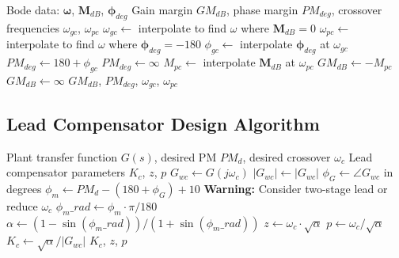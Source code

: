 \begin{algorithm}[H]
\caption{Stability Margin Computation}
\label{alg:margins}
\begin{algorithmic}[1]
\REQUIRE Bode data: $\boldsymbol{\omega}$, $\mathbf{M}_{dB}$, $\boldsymbol{\phi}_{deg}$
\ENSURE Gain margin $GM_{dB}$, phase margin $PM_{deg}$, crossover frequencies $\omega_{gc}$, $\omega_{pc}$
\STATE
\STATE {}
\STATE $\omega_{gc} \gets$ interpolate to find $\omega$ where $\mathbf{M}_{dB} = 0$
\STATE
\STATE {}
\STATE $\omega_{pc} \gets$ interpolate to find $\omega$ where $\boldsymbol{\phi}_{deg} = -180$
\STATE
\STATE {}
    \STATE $\phi_{gc} \gets$ interpolate $\boldsymbol{\phi}_{deg}$ at $\omega_{gc}$
    \STATE $PM_{deg} \gets 180 + \phi_{gc}$
\ELSE
    \STATE $PM_{deg} \gets \infty$ 
\ENDIF
\STATE
\STATE {}
    \STATE $M_{pc} \gets$ interpolate $\mathbf{M}_{dB}$ at $\omega_{pc}$
    \STATE $GM_{dB} \gets -M_{pc}$
\ELSE
    \STATE $GM_{dB} \gets \infty$ 
\ENDIF
\STATE
\RETURN $GM_{dB}$, $PM_{deg}$, $\omega_{gc}$, $\omega_{pc}$
\end{algorithmic}
\end{algorithm}

\subsection{Lead Compensator Design Algorithm}
\label{subsec:lead_design_algorithm}

\begin{algorithm}[H]
\caption{Lead Compensator Design via Bode Method}
\label{alg:lead_design}
\begin{algorithmic}[1]
\REQUIRE Plant transfer function $G(s)$, desired PM $PM_d$, desired crossover $\omega_c$
\ENSURE Lead compensator parameters $K_c$, $z$, $p$
\STATE
\STATE {}
\STATE $G_{wc} \gets G(j\omega_c)$
\STATE $|G_{wc}| \gets |G_{wc}|$
\STATE $\phi_G \gets \angle G_{wc}$ in degrees
\STATE
\STATE {}
\STATE $\phi_m \gets PM_d - (180 + \phi_G) + 10$ 
\STATE
\STATE {}
    \STATE \textbf{Warning:} Consider two-stage lead or reduce $\omega_c$
\ENDIF
\STATE
\STATE {}
\STATE $\phi_m\_rad \gets \phi_m \cdot \pi / 180$
\STATE $\alpha \gets (1 - \sin(\phi_m\_rad)) / (1 + \sin(\phi_m\_rad))$
\STATE
\STATE {}
\STATE $z \gets \omega_c \cdot \sqrt{\alpha}$
\STATE $p \gets \omega_c / \sqrt{\alpha}$
\STATE
\STATE {}
\STATE $K_c \gets \sqrt{\alpha} / |G_{wc}|$
\STATE
\RETURN $K_c$, $z$, $p$
\end{algorithmic}
\end{algorithm}


